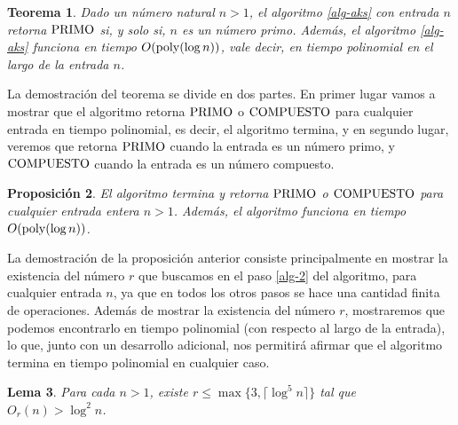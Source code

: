 \documentclass[10pt]{article}
\newcommand{\0}{\mathbf{0}}
\newcommand{\1}{\mathbf{1}}
\newcommand{\poly}{{\rm poly}}
\newcommand{\+}{\oplus}
\newtheorem{theorem}{Teorema}[section]
\newtheorem{lemma}[theorem]{Lema}
\newtheorem{proposition}[theorem]{Proposición}
\theoremstyle{remark}
\theoremstyle{remark}
\newcommand{\PRIMO}{\text{\rm PRIMO}}
\newcommand{\COMPUESTO}{\text{\rm COMPUESTO}}
\begin{document}
	\begin{theorem} \label{teo-4.1}
		Dado un número natural $n > 1$, el algoritmo \ref{alg-aks} con entrada $n$ retorna $\PRIMO$ 
		si, y solo si, $n$ es un número primo. Además, el algoritmo \ref{alg-aks} funciona en tiempo $O(\poly(\log n))$, vale decir, en tiempo polinomial en el largo de la entrada $n$. 
	\end{theorem}
	La demostración del teorema se divide en dos partes. En primer lugar vamos a mostrar que el algoritmo retorna $\PRIMO$ o $\COMPUESTO$ para cualquier entrada en tiempo polinomial, es decir, el algoritmo termina, y en segundo lugar, veremos que retorna $\PRIMO$ cuando la entrada es un número primo, y $\COMPUESTO$ cuando la entrada es un número compuesto. 
	\begin{proposition}\label{prop-lem-1}
		El algoritmo termina y retorna $\PRIMO$ o $\COMPUESTO$ para cualquier entrada entera $n>1$. Además, el algoritmo funciona en tiempo $O(\poly(\log n))$.
	\end{proposition}
	La demostración de la proposición anterior consiste principalmente en mostrar la existencia del número $r$ que buscamos en el paso \ref{alg-2} del algoritmo, para cualquier entrada $n$, ya que en todos los otros pasos se hace una cantidad finita de operaciones. Además de mostrar la existencia del número $r$, mostraremos que podemos encontrarlo en tiempo polinomial (con respecto al largo de la entrada), lo que, junto con un desarrollo adicional, nos permitirá afirmar que el algoritmo termina en tiempo polinomial en cualquier caso. 
	\begin{lemma}\label{prop-1}
		Para cada $n > 1$, existe $r \leq \max\{3,\lceil \log ^5 n\rceil\}$ tal que $O_r(n)>\log ^2 n$.
	\end{lemma}
\end{document}

